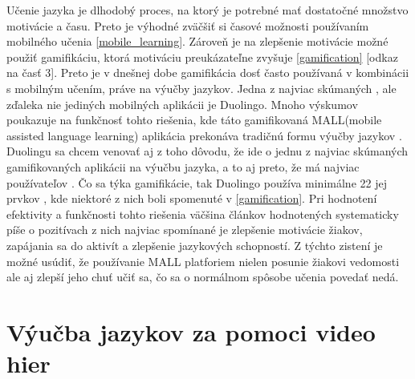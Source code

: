 \documentclass[10pt,slovak,a4paper]{article}
\begin{document}
Učenie jazyka je dlhodobý proces, na ktorý je potrebné mať dostatočné množstvo motivácie a času. Preto je výhodné zväčšiť si časové možnosti používaním mobilného učenia \ref{mobile_learning}. Zároveň je na zlepšenie motivácie možné použiť gamifikáciu, ktorá motiváciu preukázateľne zvyšuje \ref{gamification} [odkaz na časť 3].
Preto je v dnešnej dobe gamifikácia dosť často používaná v kombinácii s mobilným učením, práve na výučby jazykov. Jedna z najviac skúmaných \cite{dehganzadeh2020investigating}, ale zďaleka nie jediných mobilných aplikácii je Duolingo.
Mnoho výskumov poukazuje na funkčnosť tohto riešenia, kde táto gamifikovaná MALL(mobile assisted language learning) aplikácia prekonáva tradičnú formu výučby jazykov \cite{LEVY2007185}.
Duolingu sa chcem venovať aj z toho dôvodu, že ide o jednu z najviac skúmaných gamifikovaných aplikácii na výučbu jazyka, a to aj preto, že má najviac používateľov \cite{doi:10.1080/09588221.2021.1933540}.
Čo sa týka gamifikácie, tak Duolingo používa minimálne 22 jej prvkov \cite{doi:10.1080/09588221.2021.1933540}, kde niektoré z nich boli spomenuté v \ref{gamification}.
Pri hodnotení efektivity a funkčnosti tohto riešenia väčšina článkov hodnotených systematicky píše o pozitívach \cite{dehganzadeh2020investigating} z nich najviac spomínané je zlepšenie motivácie žiakov, zapájania sa do aktivít a zlepšenie jazykových schopností.
Z týchto zistení je možné usúdiť, že používanie MALL platforiem nielen posunie žiakovi vedomosti ale aj zlepší jeho chuť učiť sa, čo sa o normálnom spôsobe učenia povedať nedá.


\newpage
\section{Výučba jazykov za pomoci video hier} \label{language_learning_games}
\end{document}
